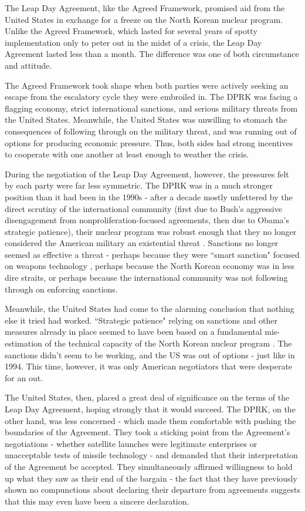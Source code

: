 \documentclass{article}
\begin{document}
The Leap Day Agreement, like the Agreed Framework, promised aid from the United States in exchange for a freeze on the North Korean nuclear program. Unlike the Agreed Framework, which lasted for several years of spotty implementation only to peter out in the midst of a crisis, the Leap Day Agreement lasted less than a month. The difference was one of both circumstance and attitude.

The Agreed Framework took shape when both parties were actively seeking an escape from the escalatory cycle they were embroiled in. The DPRK was facing a flagging economy, strict international sanctions, and serious military threats from the United States. Meanwhile, the United States was unwilling to stomach the consequences of following through on the military threat, and was running out of options for producing economic pressure. Thus, both sides had strong incentives to cooperate with one another at least enough to weather the crisis.

During the negotiation of the Leap Day Agreement, however, the pressures felt by each party were far less symmetric. The DPRK was in a much stronger position than it had been in the 1990s - after a decade mostly unfettered by the direct scrutiny of the international community (first due to Bush's aggressive disengagement from nonproliferation-focused agreements, then due to Obama's strategic patience), their nuclear program was robust enough that they no longer considered the American military an existential threat \cite{harnisch,hecker2}. Sanctions no longer seemed as effective a threat - perhaps because they were ``smart sanction" focused on weapons technology \cite{delury}, perhaps because the North Korean economy was in less dire straits, or perhaps because the international community was not following through on enforcing sanctions\cite{perlez}.

Meanwhile, the United States had come to the alarming conclusion that nothing else it tried had worked. ``Strategic patience" relying on sanctions and other measures already in place seemed to have been based on a fundamental mis-estimation of the technical capacity of the North Korean nuclear program \cite{snyder2}. The sanctions didn't seem to be working, and the US was out of options - just like in 1994. This time, however, it was only American negotiators that were desperate for an out.

The United States, then, placed a great deal of significance on the terms of the Leap Day Agreement, hoping strongly that it would succeed. The DPRK, on the other hand, was less concerned - which made them comfortable with pushing the boundaries of the Agreement. They took a sticking point from the Agreement's negotiations - whether satellite launches were legitimate enterprises or unacceptable tests of missile technology \cite{delury} - and demanded that their interpretation of the Agreement be accepted. They simultaneously affirmed willingness to hold up what they saw as their end of the bargain - the fact that they have previously shown no compunctions about declaring their departure from agreements suggests that this may even have been a sincere declaration.
\end{document}
